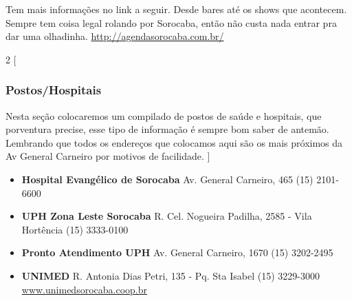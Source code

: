 Tem mais informações no link a seguir. Desde bares até os shows que acontecem. Sempre tem coisa legal rolando por Sorocaba, então não custa nada entrar pra dar uma olhadinha. \url{http://agendasorocaba.com.br/}

\newpage

\begin{multicols}{2}
  [
    \subsubsection{Postos/Hospitais}
    Nesta seção colocaremos um compilado de postos de saúde e hospitais, que porventura precise, esse tipo de informação é sempre bom saber de antemão. Lembrando que todos os endereços que colocamos aqui são os mais próximos da Av General Carneiro por motivos de facilidade.
  ]
  \begin{itemize}
    \item \textbf{Hospital Evangélico de Sorocaba}
      \newline Av. General Carneiro, 465
      \newline (15) 2101-6600
  \end{itemize}
  \begin{itemize}
    \item \textbf{UPH Zona Leste Sorocaba}
      \newline R. Cel. Nogueira Padilha, 2585 - Vila Hortência
      \newline (15) 3333-0100
  \end{itemize}
  \begin{itemize}
    \item \textbf{Pronto Atendimento UPH}
      \newline Av. General Carneiro, 1670
      \newline (15) 3202-2495
  \end{itemize}
  \begin{itemize}
    \item \textbf{UNIMED}
	\newline R. Antonia Dias Petri, 135 - Pq. Sta Isabel
	\newline (15) 3229-3000
	\newline \url{www.unimedsorocaba.coop.br}
  \end{itemize}
\end{multicols}


